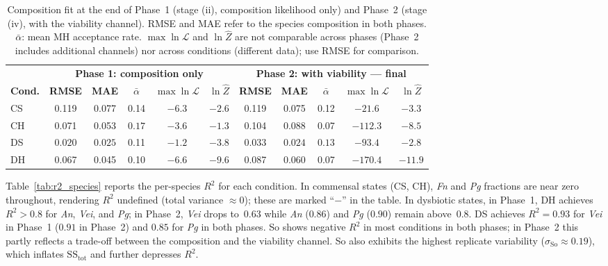 \documentclass[11pt,a4paper]{article}
\begin{document}
\begin{table}[htbp]
\centering\footnotesize\setlength{\tabcolsep}{3pt}
\begin{tabular}{@{}l ccccc ccccc@{}}
\toprule
& \multicolumn{5}{c}{\textbf{Phase 1: composition only}} & \multicolumn{5}{c}{\textbf{Phase 2: with viability --- final}}\\
\cmidrule(lr){2-6}\cmidrule(lr){7-11}
\textbf{Cond.} & \textbf{RMSE} & \textbf{MAE} & $\bar{\alpha}$ & $\max\ln\mathcal{L}$ & $\ln\hat{Z}$ & \textbf{RMSE} & \textbf{MAE} & $\bar{\alpha}$ & $\max\ln\mathcal{L}$ & $\ln\hat{Z}$\\
\midrule
CS  & 0.119 & 0.077 & 0.14 & $-6.3$ & $-2.6$ & 0.119 & 0.075 & 0.12 & $-21.6$ & $-3.3$\\
CH  & 0.071 & 0.053 & $\mathbf{0.17}$ & $-3.6$ & $-1.3$ & 0.104 & 0.088 & 0.07 & $-112.3$ & $-8.5$\\
DS  & $\mathbf{0.020}$ & $\mathbf{0.025}$ & 0.11 & $\mathbf{-1.2}$ & $-3.8$ & $\mathbf{0.033}$ & $\mathbf{0.024}$ & $\mathbf{0.13}$ & $-93.4$ & $-2.8$\\
DH  & 0.067 & 0.045 & 0.10 & $-6.6$ & $-9.6$ & 0.087 & 0.060 & 0.07 & $-170.4$ & $-11.9$\\
\bottomrule
\end{tabular}
\caption{Composition fit at the end of Phase~1 (stage (ii), composition likelihood only) and Phase~2 (stage (iv), with the viability channel).
RMSE and MAE refer to the species composition in both phases.
$\bar{\alpha}$: mean MH acceptance rate.
$\max\ln\mathcal{L}$ and $\ln\hat{Z}$ are not comparable across phases (Phase~2 includes additional channels) nor across conditions (different data); use RMSE for comparison.}
\label{tab:rmse}
\end{table}

Table~\ref{tab:r2_species} reports the per-species $R^2$ for each condition.
In commensal states (CS, CH), \textit{Fn} and \textit{Pg} fractions are near zero throughout, rendering $R^2$ undefined (total variance $\approx0$); these are marked ``$-$'' in the table.
In dysbiotic states, in Phase~1, DH achieves $R^2>0.8$ for \textit{An}, \textit{Vei}, and \textit{Pg}; in Phase~2, \textit{Vei} drops to~$0.63$ while \textit{An} ($0.86$) and \textit{Pg} ($0.90$) remain above~$0.8$.
DS achieves $R^2=0.93$ for \textit{Vei} in Phase~1 ($0.91$ in Phase~2) and $0.85$ for \textit{Pg} in both phases.
So shows negative $R^2$ in most conditions in both phases; in Phase~2 this partly reflects a trade-off between the composition and the viability channel.
So also exhibits the highest replicate variability ($\sigma_{\mathrm{So}}\approx0.19$), which inflates $\mathrm{SS}_{\mathrm{tot}}$ and further depresses $R^2$.
\end{document}
